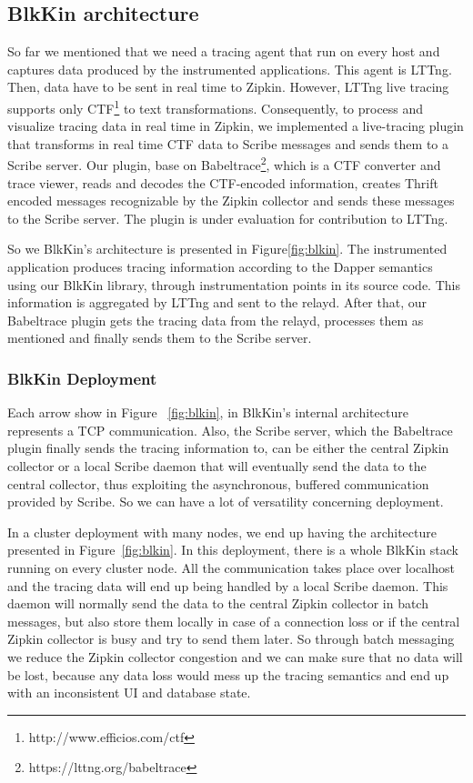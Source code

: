 \documentclass[11pt,journal,compsoc]{IEEEtran}
\begin{document}
\subsection{BlkKin architecture}
So far we mentioned that we need a tracing agent that run on every host and
captures data produced by the instrumented applications. This agent is LTTng.
Then, data have to be sent in real time to Zipkin. However, LTTng live tracing
supports only CTF\footnote{http://www.efficios.com/ctf} to text
transformations. Consequently, to process and visualize tracing data in real
time in Zipkin, we implemented a live-tracing plugin that transforms in real
time CTF data to Scribe messages and sends them to a Scribe server. Our plugin,
base on Babeltrace\footnote{https://lttng.org/babeltrace}, which is a CTF
converter and trace viewer, reads and decodes the CTF-encoded information,
creates Thrift encoded messages recognizable by the Zipkin collector and sends
these messages to the Scribe server. The plugin is under evaluation for
contribution to LTTng.

So we BlkKin's architecture is presented in Figure\ref{fig:blkin}. The
instrumented application produces tracing information according to the Dapper
semantics using our BlkKin library, through instrumentation points in its source
code. This information is aggregated by LTTng and sent to the relayd. After
that, our Babeltrace plugin gets the tracing data from the relayd, processes
them as mentioned and finally sends them to the Scribe server.

\subsubsection{BlkKin Deployment} Each arrow show in Figure ~\ref{fig:blkin}, in
BlkKin's internal architecture represents a TCP communication. Also, the
Scribe server, which the Babeltrace plugin finally sends the tracing
information to, can be either the central Zipkin collector or a local Scribe
daemon that will eventually send the data to the central collector, thus
exploiting the asynchronous, buffered communication provided by Scribe. So we
can have a lot of versatility concerning deployment.

In a cluster deployment with many nodes, we end up having the architecture
presented in Figure~\ref{fig:blkin}. In this deployment, there is a whole
BlkKin stack running on every cluster node. All the communication takes place
over localhost and the tracing data will end up being handled by a local Scribe
daemon. This daemon will normally send the data to the central Zipkin collector
in batch messages, but also store them locally in case of a connection loss or
if the central Zipkin collector is busy and try to send them later. So through
batch messaging we reduce the Zipkin collector congestion and we can make sure
that no data will be lost, because any data loss would mess up the tracing
semantics and end up with an inconsistent UI and database state.
\end{document}
